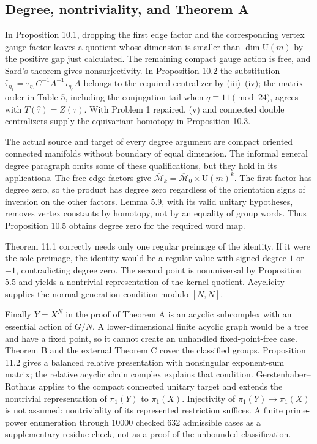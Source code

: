 \documentclass[10pt]{article}
\begin{document}
\subsection*{Degree, nontriviality, and Theorem A}
In Proposition 10.1, dropping the first edge factor and the corresponding vertex gauge factor leaves a quotient whose dimension is smaller than \(\dim\mathrm U(m)\) by the positive gap just calculated. The remaining compact gauge action is free, and Sard’s theorem gives nonsurjectivity. In Proposition 10.2 the substitution \(\widehat\tau_{\eta_1}=\tau_{\eta_1}C^{-1}A^{-1}\tau_{\eta_0}A\) belongs to the required centralizer by (iii)–(iv); the matrix order in Table 5, including the conjugation tail when \(q\equiv11\pmod{24}\), agrees with \(T(\widehat\tau)=Z(\tau)\). With Problem 1 repaired, (v) and connected double centralizers supply the equivariant homotopy in Proposition 10.3.\par
The actual source and target of every degree argument are compact oriented connected manifolds without boundary of equal dimension. The informal general degree paragraph omits some of these qualifications, but they hold in its applications. The free-edge factors give \(\overline{\mathcal M}_k=\overline{\mathcal M}_0\times\mathrm U(m)^k\). The first factor has degree zero, so the product has degree zero regardless of the orientation signs of inversion on the other factors. Lemma 5.9, with its valid unitary hypotheses, removes vertex constants by homotopy, not by an equality of group words. Thus Proposition 10.5 obtains degree zero for the required word map.\par
Theorem 11.1 correctly needs only one regular preimage of the identity. If it were the sole preimage, the identity would be a regular value with signed degree \(1\) or \(-1\), contradicting degree zero. The second point is nonuniversal by Proposition 5.5 and yields a nontrivial representation of the kernel quotient. Acyclicity supplies the normal-generation condition modulo \([N,N]\).\par
Finally \(Y=X^N\) in the proof of Theorem A is an acyclic subcomplex with an essential action of \(G/N\). A lower-dimensional finite acyclic graph would be a tree and have a fixed point, so it cannot create an unhandled fixed-point-free case. Theorem B and the external Theorem C cover the classified groups. Proposition 11.2 gives a balanced relative presentation with nonsingular exponent-sum matrix; the relative acyclic chain complex explains that condition. Gerstenhaber–Rothaus applies to the compact connected unitary target and extends the nontrivial representation of \(\pi_1(Y)\) to \(\pi_1(X)\). Injectivity of \(\pi_1(Y)\to\pi_1(X)\) is not assumed: nontriviality of its represented restriction suffices. A finite prime-power enumeration through \(10000\) checked 632 admissible cases as a supplementary residue check, not as a proof of the unbounded classification.\par
\end{document}
